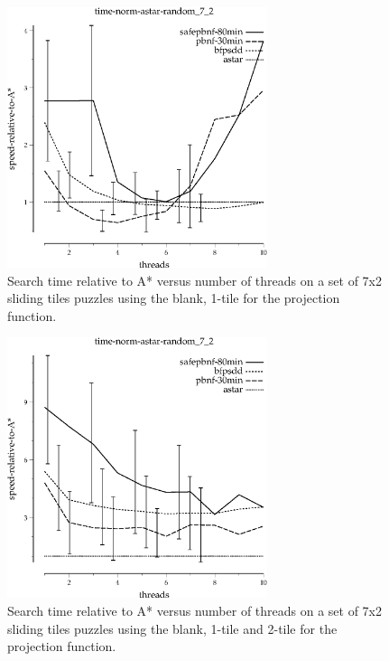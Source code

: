 \documentclass{article}
\begin{document}
 \begin{figure}[t]
 \begin{center}
 \includegraphics[width=3in]{images/tiles-time-norm-random-7-2.eps}
 \caption{Search time relative to A* versus number of threads on a set
   of 7x2 sliding tiles puzzles using the blank, 1-tile for the
   projection function.}
 \label{fig:tiles-7x2}
 \end{center}
 \end{figure}

 \begin{figure}[t]
 \begin{center}
 \includegraphics[width=3in]{images/tiles-time-norm-random-7-2-newabstraction.eps}
 \caption{Search time relative to A* versus number of threads on a set
   of 7x2 sliding tiles puzzles using the blank, 1-tile and 2-tile for
   the projection function.}
 \label{fig:tiles-7x2-new}
 \end{center}
 \end{figure}
\end{document}

